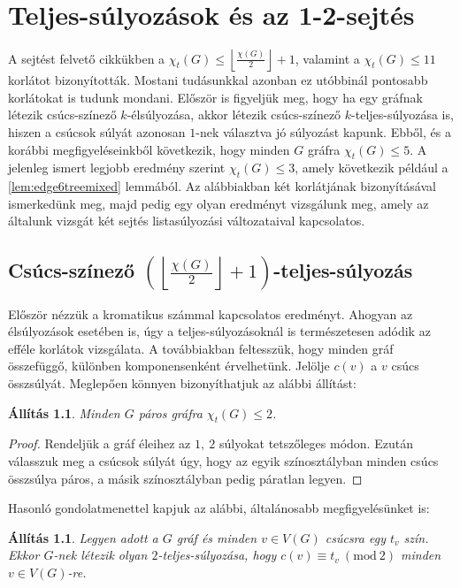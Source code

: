 \documentclass[12pt, a4paper]{report}
\newtheorem{áll}[tét]{Állítás}
\theoremstyle{remark}
\theoremstyle{definition}
\begin{document}
\chapter{Teljes-súlyozások és az 1-2-sejtés}
A sejtést felvető cikkükben \citeauthor{Przybylo2010} a $\chi_t(G) \leq \left\lfloor \frac{\chi(G)}{2} \right\rfloor + 1$, valamint a $\chi_t(G) \leq 11$ korlátot bizonyították. Mostani tudásunkkal azonban ez utóbbinál pontosabb korlátokat is tudunk mondani. Először is figyeljük meg, hogy ha egy gráfnak létezik csúcs-színező $k$-élsúlyozása, akkor létezik csúcs-színező $k$-teljes-súlyozása is, hiszen a csúcsok súlyát azonosan $1$-nek választva jó súlyozást kapunk. Ebből, és a korábbi megfigyeléseinkből következik, hogy minden $G$ gráfra $\chi_t(G) \leq 5$. A jelenleg ismert legjobb eredmény szerint $\chi_t(G) \leq 3$, amely következik például a \ref{lem:edge6treemixed} lemmából. Az alábbiakban \citeauthor{Przybylo2010} két korlátjának bizonyításával ismerkedünk meg, majd pedig egy olyan eredményt vizsgálunk meg, amely az általunk vizsgát két sejtés listasúlyozási változataival kapcsolatos.

\section{Csúcs-színező $\left( \left\lfloor \frac{χ(G)}{2} \right\rfloor + 1 \right)$-teljes-súlyozás}
Először nézzük a kromatikus számmal kapcsolatos eredményt. Ahogyan az élsúlyozások esetében is, úgy a teljes-súlyozásoknál is természetesen adódik az efféle korlátok vizsgálata. A továbbiakban feltesszük, hogy minden gráf összefüggő, különben komponensenként érvelhetünk. Jelölje $c(v)$ a $v$ csúcs összsúlyát. Meglepően könnyen bizonyíthatjuk az alábbi állítást:

\begin{áll}
Minden $G$ páros gráfra $\chi_t(G) \leq 2$.
\end{áll}

\begin{proof}
Rendeljük a gráf éleihez az $1,\ 2$ súlyokat tetszőleges módon. Ezután válasszuk meg a csúcsok súlyát úgy, hogy az egyik színosztályban minden csúcs összsúlya páros, a másik színosztályban pedig páratlan legyen.
\end{proof}

Hasonló gondolatmenettel kapjuk az alábbi, általánosabb megfigyelésünket is:

\begin{áll}
Legyen adott a $G$ gráf és minden $v \in V(G)$ csúcsra egy $t_v$ szín. Ekkor $G$-nek létezik olyan $2$-teljes-súlyozása, hogy $c(v) ≡ t_v\ (\mathrm{mod}\ 2)$ minden $v \in V(G)$-re. 
\end{áll}
\end{document}
